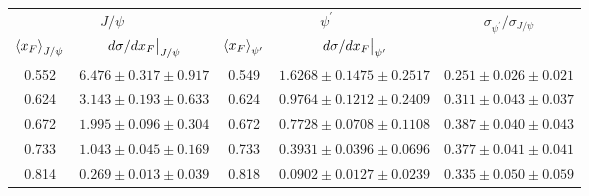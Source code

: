 \begin{tabular}{cc|cc|c}
\hline
\multicolumn{2}{c|}{$J/\psi$} &
  \multicolumn{2}{c|}{$\psi^{\prime}$} &
  \multirow{2}{*}{$\sigma_{\psi^\prime}/\sigma_{J/\psi}$} \\ \cline{1-4}
$\expval{x_F}_{J/\psi}$ &
  $\eval{d\sigma/dx_F}_{J/\psi}$ &
  $\expval{x_F}_{\psi^\prime}$ &
  $\eval{d\sigma/dx_F}_{\psi^\prime}$ &
   \\ \hline
0.552 & $6.476\pm0.317\pm0.917$ & 0.549 & $1.6268\pm0.1475\pm0.2517$ & $0.251\pm0.026\pm0.021$ \\
0.624 & $3.143\pm0.193\pm0.633$ & 0.624 & $0.9764\pm0.1212\pm0.2409$ & $0.311\pm0.043\pm0.037$ \\
0.672 & $1.995\pm0.096\pm0.304$ & 0.672 & $0.7728\pm0.0708\pm0.1108$ & $0.387\pm0.040\pm0.043$ \\
0.733 & $1.043\pm0.045\pm0.169$ & 0.733 & $0.3931\pm0.0396\pm0.0696$ & $0.377\pm0.041\pm0.041$ \\
0.814 & $0.269\pm0.013\pm0.039$ & 0.818 & $0.0902\pm0.0127\pm0.0239$ & $0.335\pm0.050\pm0.059$ \\ \hline
\end{tabular}

